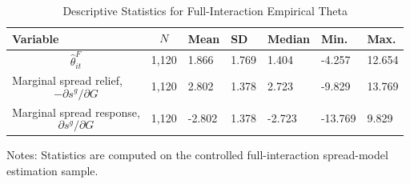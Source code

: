 \begin{table}[H]\centering
\begin{threeparttable}
\caption{Descriptive Statistics for Full-Interaction Empirical Theta}
\label{tab:theta_descriptive_stats}
\scriptsize
\begin{tabularx}{\textwidth}{lYYYYYY}
\toprule
Variable & $$N$$ & Mean & SD & Median & Min. & Max. \\
\midrule
$$\widehat{\theta}^{F}_{it}$$ & 1,120 & 1.866 & 1.769 & 1.404 & -4.257 & 12.654 \\
Marginal spread relief, $$-\partial s^g/\partial G$$ & 1,120 & 2.802 & 1.378 & 2.723 & -9.829 & 13.769 \\
Marginal spread response, $$\partial s^g/\partial G$$ & 1,120 & -2.802 & 1.378 & -2.723 & -13.769 & 9.829 \\
\bottomrule
\end{tabularx}
\begin{tablenotes}[flushleft]\footnotesize
\item Notes: Statistics are computed on the controlled full-interaction spread-model estimation sample.
\end{tablenotes}
\end{threeparttable}
\end{table}
